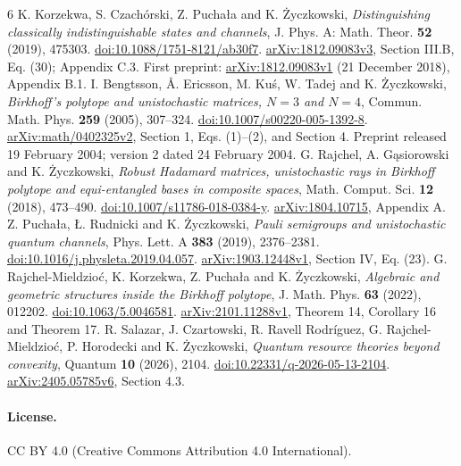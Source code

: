 \documentclass[11pt]{article}
\begin{document}
\begin{thebibliography}{6}
K. Korzekwa, S. Czach\'orski, Z. Pucha\l a and K. \.Zyczkowski,
\emph{Distinguishing classically indistinguishable states and channels},
J. Phys. A: Math. Theor. \textbf{52} (2019), 475303.
\href{https://doi.org/10.1088/1751-8121/ab30f7}{doi:10.1088/1751-8121/ab30f7}.
\href{https://arxiv.org/abs/1812.09083v3}{arXiv:1812.09083v3},
Section III.B, Eq. (30); Appendix C.3.
First preprint: \href{https://arxiv.org/abs/1812.09083v1}{arXiv:1812.09083v1}
(21 December 2018), Appendix B.1.
I. Bengtsson, \AA. Ericsson, M. Ku\'s, W. Tadej and K. \.Zyczkowski,
\emph{Birkhoff's polytope and unistochastic matrices, $N=3$ and $N=4$},
Commun. Math. Phys. \textbf{259} (2005), 307--324.
\href{https://doi.org/10.1007/s00220-005-1392-8}{doi:10.1007/s00220-005-1392-8}.
\href{https://arxiv.org/abs/math/0402325v2}{arXiv:math/0402325v2},
Section 1, Eqs. (1)--(2), and Section 4.
Preprint released 19 February 2004; version 2 dated 24 February 2004.
G. Rajchel, A. G\k{a}siorowski and K. \.Zyczkowski,
\emph{Robust Hadamard matrices, unistochastic rays in Birkhoff polytope
and equi-entangled bases in composite spaces},
Math. Comput. Sci. \textbf{12} (2018), 473--490.
\href{https://doi.org/10.1007/s11786-018-0384-y}{doi:10.1007/s11786-018-0384-y}.
\href{https://arxiv.org/abs/1804.10715}{arXiv:1804.10715}, Appendix A.
Z. Pucha\l a, \L. Rudnicki and K. \.Zyczkowski,
\emph{Pauli semigroups and unistochastic quantum channels},
Phys. Lett. A \textbf{383} (2019), 2376--2381.
\href{https://doi.org/10.1016/j.physleta.2019.04.057}{doi:10.1016/j.physleta.2019.04.057}.
\href{https://arxiv.org/abs/1903.12448v1}{arXiv:1903.12448v1}, Section IV, Eq. (23).
G. Rajchel-Mieldzio\'c, K. Korzekwa, Z. Pucha\l a and K. \.Zyczkowski,
\emph{Algebraic and geometric structures inside the Birkhoff polytope},
J. Math. Phys. \textbf{63} (2022), 012202.
\href{https://doi.org/10.1063/5.0046581}{doi:10.1063/5.0046581}.
\href{https://arxiv.org/abs/2101.11288v1}{arXiv:2101.11288v1},
Theorem 14, Corollary 16 and Theorem 17.
R. Salazar, J. Czartowski, R. Ravell Rodr\'iguez, G. Rajchel-Mieldzio\'c,
P. Horodecki and K. \.Zyczkowski,
\emph{Quantum resource theories beyond convexity},
Quantum \textbf{10} (2026), 2104.
\href{https://doi.org/10.22331/q-2026-05-13-2104}{doi:10.22331/q-2026-05-13-2104}.
\href{https://arxiv.org/abs/2405.05785v6}{arXiv:2405.05785v6}, Section 4.3.
\end{thebibliography}
\paragraph{License.} CC BY 4.0 (Creative Commons Attribution 4.0 International).
\end{document}

